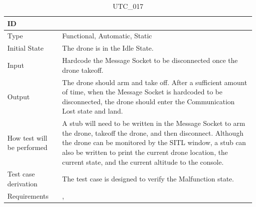 \documentclass[12pt, titlepage]{article}
\begin{document}
\begin{table}[!h]
\begin{center}
\caption {UTC\_017}
\label{tab:UTC_017}
\begin{tabular}{ | m{3.2cm} | m{12.2cm} | } 
\hline
ID & \nameref{tab:UTC_017} \\ 
\hline
Type &  Functional, Automatic, Static  \\ 
\hline
Initial State & The drone is in the Idle State. \\ 
\hline
Input &  Hardcode the Message Socket to be disconnected once the drone takeoff. \\ 
\hline
Output &  The drone should arm and take off. After a sufficient amount of time, when the Message Socket is hardcoded to be disconnected, the drone should enter the Communication Lost state and land.\\  
\hline
How test will be performed & A stub will need to be written in the Message Socket to arm the drone, takeoff the drone, and then disconnect. Although the drone can be monitored by the SITL window, a stub can also be written to print the current drone location, the current state, and the current altitude to the console.\\ 
\hline
Test case derivation &  The test case is designed to verify the Malfunction state. \\ 
\hline
Requirements & \nameref{STA_010}, \nameref{TRANS_010} \\ 
\hline
\end{tabular}
\end{center}
\end{table}
\end{document}
